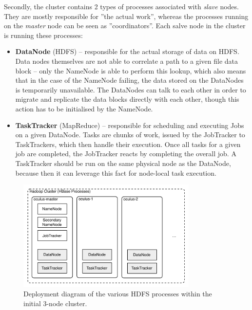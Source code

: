 Secondly, the cluster contains 2 types of processes associated with \textit{slave} nodes. They are mostly responsible for ''the actual work'', whereas the processes running on the \textit{master} node can be seen as ''coordinators''. Each salve node in the cluster is running these processes:

\begin{itemize}
  \item \textbf{DataNode} (HDFS) -- responsible for the actual storage of data on HDFS. Data nodes themselves are not able 
                                    to correlate a path to a given file data block -- only the NameNode is able to 
                                    perform this lookup, which also means that in the case of the NameNode failing,
                                    the data stored on the DataNodes is temporarily unavailable. The DataNodes can talk 
                                    to each other in order to migrate and replicate the data blocks directly with each
                                    other, though this action has to be initialised by the NameNode.
  
  \item \textbf{TaskTracker} (MapReduce) -- responsible for scheduling and executing Jobs on a given DataNode. Tasks are
                                            chunks of work, issued by the JobTracker to TaskTrackers, which then handle
                                            their execution. Once all tasks for a given job are completed, the JobTracker 
                                            reacts by completing the overall job. A TaskTracker should be run on the same
                                            physical node as the DataNode, because then it can leverage this fact for
                                            node-local task execution.
\end{itemize}


\begin{figure}[ch!]
  \centering
  \includegraphics[width=0.8\textwidth]{img/hdfs-processes}
  \caption{Deployment diagram of the various HDFS processes within the initial 3-node cluster.}
  \label{fig:small-cluster-deployment}
\end{figure}

